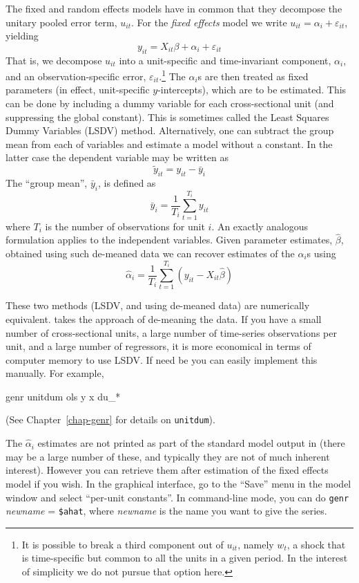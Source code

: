 The fixed and random effects models have in common that they decompose
the unitary pooled error term, $u_{it}$.  For the \textsl{fixed effects}
model we write $u_{it} = \alpha_i + \varepsilon_{it}$, yielding
\begin{equation}
\label{eq:FE}
y_{it} = X_{it}\beta + \alpha_i + \varepsilon_{it}
\end{equation}
That is, we decompose $u_{it}$ into a unit-specific and time-invariant
component, $\alpha_i$, and an observation-specific error,
$\varepsilon_{it}$.\footnote{It is possible to break a third component
  out of $u_{it}$, namely $w_t$, a shock that is time-specific but
  common to all the units in a given period.  In the interest of
  simplicity we do not pursue that option here.}  The $\alpha_i$s are
then treated as fixed parameters (in effect, unit-specific
$y$-intercepts), which are to be estimated.  This can be done by
including a dummy variable for each cross-sectional unit (and
suppressing the global constant).  This is sometimes called the Least
Squares Dummy Variables (LSDV) method.  Alternatively, one can subtract
the group mean from each of variables and estimate a model without a
constant.  In the latter case the dependent variable may be written as
\[
\tilde{y}_{it} = y_{it} - \bar{y}_i
\]
The ``group mean'', $\bar{y}_i$, is defined as
\[
\bar{y}_i = \frac{1}{T_i} \sum_{t=1}^{T_i} y_{it}
\]
where $T_i$ is the number of observations for unit $i$.  An exactly
analogous formulation applies to the independent variables.  Given
parameter estimates, $\hat{\beta}$, obtained using such de-meaned data
we can recover estimates of the $\alpha_i$s using
\[
\hat{\alpha}_i = \frac{1}{T_i} \sum_{t=1}^{T_i} 
   \left(y_{it} - X_{it}\hat{\beta}\right)
\]

These two methods (LSDV, and using de-meaned data) are numerically
equivalent.  takes the approach of de-meaning the data.  If
you have a small number of cross-sectional units, a large number of
time-series observations per unit, and a large number of regressors,
it is more economical in terms of computer memory to use LSDV.  If 
need be you can easily implement this manually.  For example,
%
\begin{code}
genr unitdum
ols y x du_*
\end{code}
%
(See Chapter~\ref{chap-genr} for details on \texttt{unitdum}).

The $\hat{\alpha}_i$ estimates are not printed as part of the standard
model output in  (there may be a large number of these, and
typically they are not of much inherent interest).  However you can
retrieve them after estimation of the fixed effects model if you
wish.  In the graphical interface, go to the ``Save'' menu in the
model window and select ``per-unit constants''.  In command-line mode,
you can do \texttt{genr} \textsl{newname} = \verb+$ahat+, where
\textsl{newname} is the name you want to give the series. 

